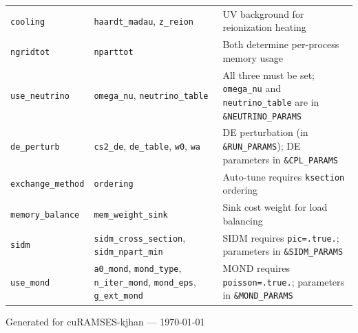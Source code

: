 \begin{longtable}{@{}p{4cm}p{4.5cm}p{6.5cm}@{}}
\addlinespace
\texttt{cooling}
  & \texttt{haardt\_madau}, \texttt{z\_reion}
  & UV background for reionization heating \\
\addlinespace
\texttt{ngridtot}
  & \texttt{nparttot}
  & Both determine per-process memory usage \\
\addlinespace
\texttt{use\_neutrino}
  & \texttt{omega\_nu}, \texttt{neutrino\_table}
  & All three must be set; \texttt{omega\_nu} and \texttt{neutrino\_table} are in \texttt{\&NEUTRINO\_PARAMS} \\
\addlinespace
\texttt{de\_perturb}
  & \texttt{cs2\_de}, \texttt{de\_table}, \texttt{w0}, \texttt{wa}
  & DE perturbation (in \texttt{\&RUN\_PARAMS}); DE parameters in \texttt{\&CPL\_PARAMS} \\
\addlinespace
\texttt{exchange\_method}
  & \texttt{ordering}
  & Auto-tune requires \texttt{ksection} ordering \\
\addlinespace
\texttt{memory\_balance}
  & \texttt{mem\_weight\_sink}
  & Sink cost weight for load balancing \\
\addlinespace
\texttt{sidm}
  & \texttt{sidm\_cross\_section}, \texttt{sidm\_npart\_min}
  & SIDM requires \texttt{pic=.true.}; parameters in \texttt{\&SIDM\_PARAMS} \\
\addlinespace
\texttt{use\_mond}
  & \texttt{a0\_mond}, \texttt{mond\_type}, \texttt{n\_iter\_mond}, \texttt{mond\_eps}, \texttt{g\_ext\_mond}
  & MOND requires \texttt{poisson=.true.}; parameters in \texttt{\&MOND\_PARAMS} \\
\end{longtable}


\vfill
\begin{center}
\small\sffamily\textcolor{apitype}{%
Generated for cuRAMSES-kjhan --- \today}
\end{center}


